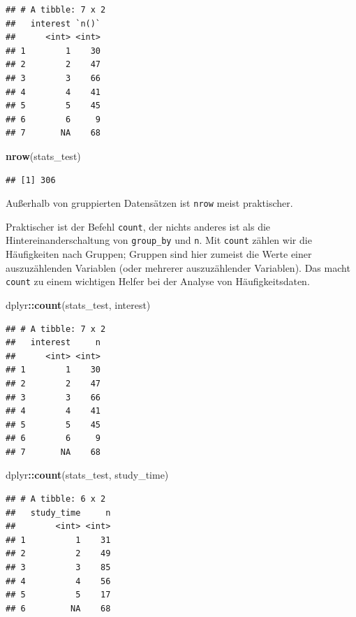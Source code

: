 \documentclass[12pt,ngerman,paper=a4,pagesize,DIV=13]{scrreprt}
\newenvironment{Shaded}{\begin{snugshade}}{\end{snugshade}}
\newcommand{\KeywordTok}[1]{\textcolor[rgb]{0.13,0.29,0.53}{\textbf{#1}}}
\newcommand{\NormalTok}[1]{#1}
\newcommand{\OperatorTok}[1]{\textcolor[rgb]{0.81,0.36,0.00}{\textbf{#1}}}
\begin{document}
\begin{verbatim}
## # A tibble: 7 x 2
##   interest `n()`
##      <int> <int>
## 1        1    30
## 2        2    47
## 3        3    66
## 4        4    41
## 5        5    45
## 6        6     9
## 7       NA    68
\end{verbatim}

\begin{Shaded}
\begin{Highlighting}[]
\KeywordTok{nrow}\NormalTok{(stats_test)}
\end{Highlighting}
\end{Shaded}

\begin{verbatim}
## [1] 306
\end{verbatim}

Außerhalb von gruppierten Datensätzen ist \texttt{nrow} meist
praktischer.

Praktischer ist der Befehl \texttt{count}, der nichts anderes ist als
die Hintereinanderschaltung von \texttt{group\_by} und \texttt{n}. Mit
\texttt{count} zählen wir die Häufigkeiten nach Gruppen; Gruppen sind
hier zumeist die Werte einer auszuzählenden Variablen (oder mehrerer
auszuzählender Variablen). Das macht \texttt{count} zu einem wichtigen
Helfer bei der Analyse von Häufigkeitsdaten.

\begin{Shaded}
\begin{Highlighting}[]
\NormalTok{dplyr}\OperatorTok{::}\KeywordTok{count}\NormalTok{(stats_test, interest)}
\end{Highlighting}
\end{Shaded}

\begin{verbatim}
## # A tibble: 7 x 2
##   interest     n
##      <int> <int>
## 1        1    30
## 2        2    47
## 3        3    66
## 4        4    41
## 5        5    45
## 6        6     9
## 7       NA    68
\end{verbatim}

\begin{Shaded}
\begin{Highlighting}[]
\NormalTok{dplyr}\OperatorTok{::}\KeywordTok{count}\NormalTok{(stats_test, study_time)}
\end{Highlighting}
\end{Shaded}

\begin{verbatim}
## # A tibble: 6 x 2
##   study_time     n
##        <int> <int>
## 1          1    31
## 2          2    49
## 3          3    85
## 4          4    56
## 5          5    17
## 6         NA    68
\end{verbatim}
\end{document}

